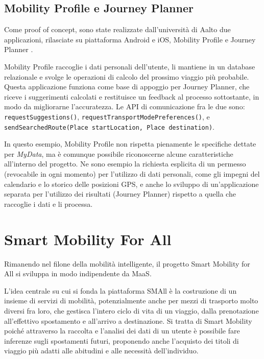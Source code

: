 \subsection{Mobility Profile e Journey Planner}
\label{sec:Contesto-MobProfJPlann}
Come proof of concept, sono state realizzate dall’università di Aalto due applicazioni, rilasciate su piattaforma Android e iOS, Mobility Profile \cite{githubmobilityprofile} e Journey Planner \cite{githubjourneyplanner}.

Mobility Profile raccoglie i dati personali dell’utente, li mantiene in un database relazionale e svolge le operazioni di calcolo del prossimo viaggio pi\`u probabile. Questa applicazione funziona come base di appoggio per Journey Planner, che riceve i suggerimenti calcolati e restituisce un feedback al processo sottostante, in modo da migliorarne l’accuratezza. Le API di comunicazione fra le due sono:
\texttt{requestSuggestions()}, \texttt{requestTransportModePreferences()}, e \texttt{sendSearchedRoute(Place startLocation, Place destination)}.

In questo esempio, Mobility Profile non rispetta pienamente le specifiche dettate per \textit{MyData}, ma \`e comunque possibile riconoscerne alcune caratteristiche all’interno del progetto. Ne sono esempio la richiesta esplicita di un permesso (revocabile in ogni momento) per l’utilizzo di dati personali, come gli impegni del calendario e lo storico delle posizioni GPS, e anche lo sviluppo di un'applicazione separata per l’utilizzo dei risultati (Journey Planner) rispetto a quella che raccoglie i dati e li processa.

\section{Smart Mobility For All}
Rimanendo nel filone della mobilità intelligente, il progetto Smart Mobility for All \cite{githubsmall} si sviluppa in modo indipendente da MaaS. 

L’idea centrale su cui si fonda la piattaforma SMAll \`e la costruzione di un insieme di servizi di mobilità, potenzialmente anche per mezzi di trasporto molto diversi fra loro, che gestisca l’intero ciclo di vita di un viaggio, dalla prenotazione all’effettivo spostamento e all’arrivo a destinazione. Si tratta di Smart Mobility poich\'e attraverso la raccolta e l’analisi dei dati di un utente \`e possibile fare inferenze sugli spostamenti futuri, proponendo anche l’acquisto dei titoli di viaggio pi\`u adatti alle abitudini e alle necessità dell’individuo.

